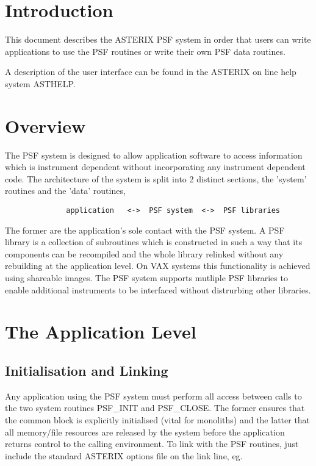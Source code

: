 \newpage 
\markright{\astdocname} 
 
\section{Introduction} 

     This document describes the ASTERIX PSF system in order that users
     can write applications to use the PSF routines or write their own
     PSF data routines.

     A description of the user interface can be found in the ASTERIX on
     line help system ASTHELP.

\section{Overview}

     The PSF system is designed to allow application software to access
     information which is instrument dependent without incorporating any
     instrument dependent code. The architecture of the system is split
     into 2 distinct sections, the 'system' routines and the 'data'
     routines,

\begin{verbatim}
              application   <->  PSF system  <->  PSF libraries
\end{verbatim}

     The former are the application's sole contact with the PSF system.
     A PSF library is a collection of subroutines which is constructed
     in such a way that its components can be recompiled and the whole
     library relinked without any rebuilding at the application level.
     On VAX systems this functionality is achieved using shareable
     images. The PSF system supports mutliple PSF libraries to enable
     additional instruments to be interfaced without distrurbing other
     libraries. 

\section{The Application Level}

\subsection{Initialisation and Linking}
     
     Any application using the PSF system must perform all access
     between calls to the two system routines PSF\_INIT and PSF\_CLOSE.
     The former ensures that the common block is explicitly initialised
     (vital for monoliths) and the latter that all memory/file resources
     are released by the system before the application returns control 
     to the calling environment. To link with the PSF routines, just
     include the standard ASTERIX options file on the link line, eg.

